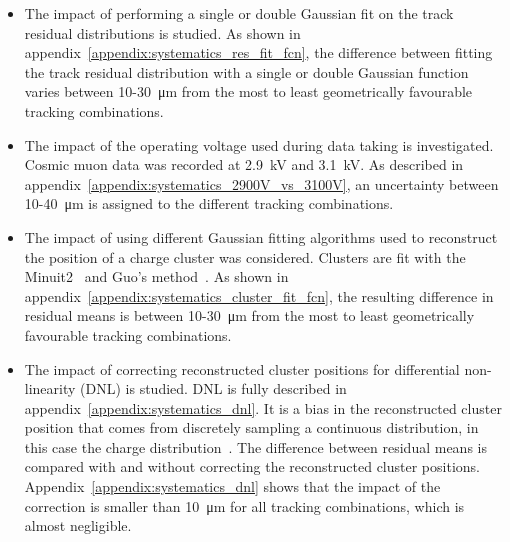 \begin{itemize}
  \item The impact of performing a single or double Gaussian fit on the track residual distributions is studied. As shown in appendix~\ref{appendix:systematics_res_fit_fcn}, the difference between fitting the track residual distribution with a single or double Gaussian function varies between 10-\SI{30}{\micro\meter} from the most to least geometrically favourable tracking combinations.
  \item The impact of the operating voltage used during data taking is investigated. Cosmic muon data was recorded at 2.9~kV and 3.1~kV. As described in appendix~\ref{appendix:systematics_2900V_vs_3100V}, an uncertainty between 10-\SI{40}{\micro\meter} is assigned to the different tracking combinations.
  \item The impact of using different Gaussian fitting algorithms used to reconstruct the position of a charge cluster was considered. Clusters are fit with the Minuit2~\cite{hatlo_developments_2005} and Guo's method~\cite{guo_simple_2011}. As shown in appendix~\ref{appendix:systematics_cluster_fit_fcn}, the resulting difference in residual means is between 10-\SI{30}{\micro\meter} from the most to least geometrically favourable tracking combinations.
  \item The impact of correcting reconstructed cluster positions for differential non-linearity (DNL) is studied. DNL is fully described in appendix~\ref{appendix:systematics_dnl}. It is a bias in the reconstructed cluster position that comes from discretely sampling a continuous distribution, in this case the charge distribution~\cite{endo_systematic_1981, lefebvre_thesis, abusleme_performance_2016}. The difference between residual means is compared with and without correcting the reconstructed cluster positions. Appendix~\ref{appendix:systematics_dnl} shows that the impact of the correction is smaller than \SI{10}{\micro\meter} for all tracking combinations, which is almost negligible.
\end{itemize}

